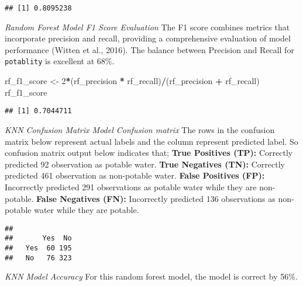 \documentclass[
]{article}
\newenvironment{Shaded}{\begin{snugshade}}{\end{snugshade}}
\newcommand{\DecValTok}[1]{\textcolor[rgb]{0.00,0.00,0.81}{#1}}
\newcommand{\FunctionTok}[1]{\textcolor[rgb]{0.13,0.29,0.53}{\textbf{#1}}}
\newcommand{\NormalTok}[1]{#1}
\newcommand{\OtherTok}[1]{\textcolor[rgb]{0.56,0.35,0.01}{#1}}
\newcommand{\SpecialCharTok}[1]{\textcolor[rgb]{0.81,0.36,0.00}{\textbf{#1}}}
\begin{document}
\begin{verbatim}
## [1] 0.8095238
\end{verbatim}

\emph{Random Forest Model F1 Score Evaluation} The F1 score combines
metrics that incorporate precision and recall, providing a comprehensive
evaluation of model performance (Witten et al., 2016). The balance
between Precision and Recall for \texttt{potablity} is excellent at
68\%.

\begin{Shaded}
\begin{Highlighting}[]
\NormalTok{rf\_f1\_score }\OtherTok{\textless{}{-}} \DecValTok{2}\SpecialCharTok{*}\NormalTok{(rf\_precision }\SpecialCharTok{*}\NormalTok{ rf\_recall)}\SpecialCharTok{/}\NormalTok{(rf\_precision }\SpecialCharTok{+}\NormalTok{ rf\_recall)}
\NormalTok{rf\_f1\_score}
\end{Highlighting}
\end{Shaded}

\begin{verbatim}
## [1] 0.7044711
\end{verbatim}

\emph{KNN Confusion Matrix Model Confusion matrix} The rows in the
confusion matrix below represent actual labels and the column represent
predicted label. So confusion matrix output below indicates that;
\textbf{True Positives (TP):} Correctly predicted 92 observation as
potable water. \textbf{True Negatives (TN):} Correctly predicted 461
observation as non-potable water. \textbf{False Positives (FP):}
Incorrectly predicted 291 observations as potable water while they are
non-potable. \textbf{False Negatives (FN):} Incorrectly predicted 136
observations as non-potable water while they are potable.

\begin{Shaded}
\end{Shaded}

\begin{verbatim}
##      
##       Yes  No
##   Yes  60 195
##   No   76 323
\end{verbatim}

\emph{KNN Model Accuracy} For this random forest model, the model is
correct by 56\%.
\end{document}

